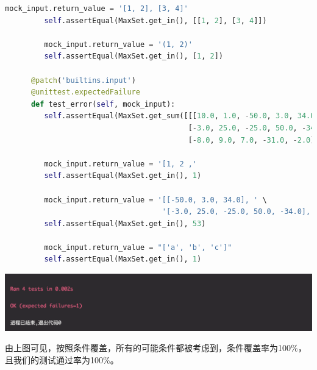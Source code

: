 \documentclass{article}
\begin{document}
\begin{lstlisting}[language = python]
         mock_input.return_value = '[1, 2], [3, 4]'
         self.assertEqual(MaxSet.get_in(), [[1, 2], [3, 4]])

         mock_input.return_value = '(1, 2)'
         self.assertEqual(MaxSet.get_in(), [1, 2])

      @patch('builtins.input')
      @unittest.expectedFailure
      def test_error(self, mock_input):
         self.assertEqual(MaxSet.get_sum([[[10.0, 1.0, -50.0, 3.0, 34.0],
                                          [-3.0, 25.0, -25.0, 50.0, -34.0],
                                          [-8.0, 9.0, 7.0, -31.0, -2.0]], [[1]]]), 53)

         mock_input.return_value = '[1, 2 ,'
         self.assertEqual(MaxSet.get_in(), 1)

         mock_input.return_value = '[[-50.0, 3.0, 34.0], ' \
                                    '[-3.0, 25.0, -25.0, 50.0, -34.0], [-8.0, 9.0, 7.0, -31.0, -2.0]])'
         self.assertEqual(MaxSet.get_in(), 53)

         mock_input.return_value = "['a', 'b', 'c']"
         self.assertEqual(MaxSet.get_in(), 1)

\end{lstlisting}
\begin{center}
   \includegraphics[scale = 0.62]{3.png}
\end{center}
由上图可见，按照条件覆盖，所有的可能条件都被考虑到，条件覆盖率为100\%，且我们的测试通过率为100\%。
\end{document}
